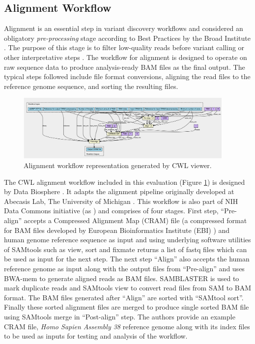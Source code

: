 \documentclass[a4paper,num-refs]{oup-contemporary}
\begin{document}
\subsection{Alignment Workflow} \label{sec:align}
Alignment is an essential step in variant discovery workflows and considered an obligatory \textit{pre-processing} stage according to Best Practices by the Broad Institute \citep{GATKBP}. The purpose of this stage is to filter low-quality reads before variant calling or other interpretative steps \citep{xu2018review}. The workflow for alignment is designed to operate on raw sequence data to produce analysis-ready BAM files as the final output. The typical steps followed include file format conversions, aligning the read files to the reference genome sequence, and sorting the resulting files. 
 \begin{figure} [b!] 
\centering
\includegraphics[width=0.95\textwidth]{images/new_alignment.png}
\captionsetup{justification=centering}
\caption{Alignment workflow representation generated by CWL viewer.}\label{fig:align}
\end{figure}
The CWL alignment workflow \citep{alignment-wf} included in this evaluation (Figure \ref{fig:align}) is designed by Data Biosphere \citep{DataBios21}. It adapts the alignment pipeline \citep{docker-alignment} originally developed at Abecasis Lab, The University of Michigan \citep{Abecasis14}. This workflow is also part of NIH Data Commons initiative (as ) and comprises of four stages. 
First step, ``Pre-align'' accepts a Compressed Alignment Map (CRAM) file (a compressed format for BAM files developed by European Bioinformatics Institute (EBI) \citep{Cochrane2012}) and human genome reference sequence as input and using underlying software utilities of SAMtools such as view, sort and fixmate returns a list of fastq files which can be used as input for the next step. The next step ``Align'' also accepts the human reference genome as input along with the output files from ``Pre-align'' and uses BWA-mem \citep{li2013aligning} to generate aligned reads as BAM files. SAMBLASTER \citep{samblaster} is used to mark duplicate reads and SAMtools view to convert read files from SAM to BAM format. The BAM files generated after ``Align'' are sorted with ``SAMtool sort''. Finally these sorted alignment files are merged to produce single sorted BAM file using SAMtools merge in ``Post-align'' step. The authors provide an example CRAM file, \textit{Homo Sapien Assembly 38} reference genome along with its index files to be used as inputs for testing and analysis of the workflow.
\end{document}
